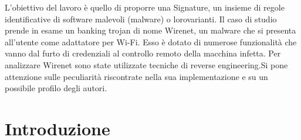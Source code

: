 \documentclass[12pt,oneside]{fithesis2}
\begin{document}
  \FrontMatter                    %
    \ThesisTitlePage                %
    



\setlength{\droptitle}{-4em}   %

\newpage
\thispagestyle{empty}
\mbox{}

    
    \begin{ThesisAbstract}          %
      L’obiettivo del lavoro è quello di proporre una Signature, un insieme di regole identificative di software malevoli (malware) o loro\newline varianti. Il caso di studio prende in esame un banking trojan di nome Wirenet, un malware che si presenta all'utente come adattatore per Wi-Fi. Esso è dotato di numerose funzionalità che vanno dal furto di credenziali al controllo remoto della macchina infetta. Per analizzare Wirenet sono state utilizzate tecniche di reverse engineering.\newline Si pone attenzione sulle peculiarità riscontrate nella sua implementazione e su un possibile profilo degli autori. %
    \end{ThesisAbstract}
    

    \renewcommand\contentsname{Indice}
    \tableofcontents                %
  
  \MainMatter                     %
    \chapter*{Introduzione}
    
        
\end{document}

